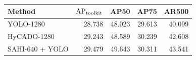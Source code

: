 \begin{tabular}{lrrrr}
\toprule
Method & $\mathrm{AP}_{\mathrm{toolkit}}$ & AP50 & AP75 & AR500\\
\midrule
YOLO-1280 & 28.738 & 48.023 & 29.613 & 40.099\\
HyCADO-1280 & 29.243 & 48.589 & 30.239 & 42.608\\
SAHI-640 + YOLO & 29.479 & 49.643 & 30.311 & 43.541\\
\bottomrule
\end{tabular}
